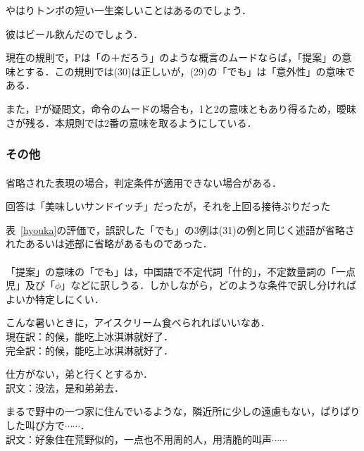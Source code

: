 \begin{enumerates}
 \setcounter{enumi}{28}
 \item やはりトンボの短い一生楽しいことはあるのでしょう．
 \item 彼はビール飲んだのでしょう．
\end{enumerates}

現在の規則で，Pは「の＋だろう」のような概言のムードならば，「提案」の意味とする．この規則では(30)は正しいが，(29)の「でも」は「意外性」の意味である．

また，Pが疑問文，命令のムードの場合も，1と2の意味ともあり得るため，曖昧さが残る．本規則では2番の意味を取るようにしている．


\subsubsection{その他}

\paragraph{}
省略された表現の場合，判定条件が適用できない場合がある．
\begin{enumerates}
 \setcounter{enumi}{30}
 \item 回答は「美味しいサンドイッチ」だったが，それを上回る接待ぶりだった
\end{enumerates}

表~\ref{hyouka}の評価で，誤訳した「でも」の3例は(31)の例と同じく述語が省略されたあるいは述部に省略があるものであった．

\paragraph{}
「提案」の意味の「でも」は，中国語で不定代詞「什的」，不定数量詞の「一点児」及び「$\phi$」などに訳しうる．しかしながら，どのような条件で訳し分ければよいか特定しにくい．

\begin{enumerates}
 \setcounter{enumi}{31}
 \item こんな暑いときに，アイスクリーム食べられればいいなあ． \\
       現在訳：的候，能吃上冰淇淋就好了． \\
       完全訳：的候，能吃上冰淇淋就好了．
 \item 仕方がない，弟と行くとするか． \\
       訳文：没法，是和弟弟去．
 \item まるで野中の一つ家に住んでいるような，隣近所に少しの遠慮もない，ぱりぱりした叫び方で$\cdots\cdots$． \\
       訳文：好象住在荒野似的，一点也不用周的人，用清脆的叫声$\cdots\cdots$
\end{enumerates}

